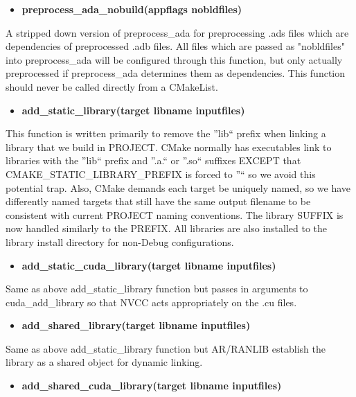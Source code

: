 \documentclass[12pt,letterpaper]{article}
\begin{document}
\begin{itemize}
\item \textbf{preprocess\_ada\_nobuild(appflags nobldfiles)}
\end{itemize}

A stripped down version of preprocess\_ada for preprocessing .ads files which are dependencies of preprocessed .adb files.  All files which are passed as "nobldfiles" into preprocess\_ada will be configured through this function, but only actually preprocessed if preprocess\_ada determines them as dependencies.  This function should never be called directly from a CMakeList.

\begin{itemize}
\item \textbf{add\_static\_library(target libname inputfiles)}
\end{itemize}

This function is written primarily to remove the ''lib`` prefix when linking a library that we build in PROJECT.  CMake normally has executables link to libraries with the ''lib`` prefix and ''.a.`` or ''.so`` suffixes EXCEPT that CMAKE\_STATIC\_LIBRARY\_PREFIX is forced to ''`` so we avoid this potential trap. Also, CMake demands each target be uniquely named, so we have differently named targets that still have the same output filename to be consistent with current PROJECT naming conventions.  The library SUFFIX is now handled similarly to the PREFIX.  All libraries are also installed to the library install directory for non-Debug configurations.

\begin{itemize}
\item \textbf{add\_static\_cuda\_library(target libname inputfiles)}
\end{itemize}

Same as above add\_static\_library function but passes in arguments to cuda\_add\_library so that NVCC acts appropriately on the .cu files.

\begin{itemize}
\item \textbf{add\_shared\_library(target libname inputfiles)}
\end{itemize}

Same as above add\_static\_library function but AR/RANLIB establish the library as a shared object for dynamic linking.

\begin{itemize}
\item \textbf{add\_shared\_cuda\_library(target libname inputfiles)}
\end{itemize}
\end{document}
